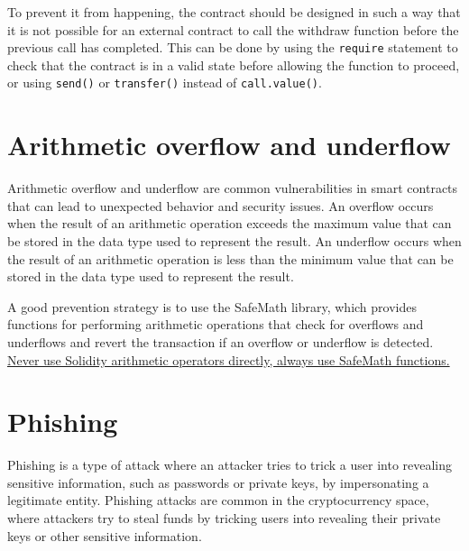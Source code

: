 To prevent it from happening, the contract should be designed in such a way that it is not possible for an external contract to call the withdraw function before the previous call has completed. This can be done by using the \texttt{require} statement to check that the contract is in a valid state before allowing the function to proceed, or using \texttt{send()} or \texttt{transfer()} instead of \texttt{call.value()}.

\section{Arithmetic overflow and underflow}
Arithmetic overflow and underflow are common vulnerabilities in smart contracts that can lead to unexpected behavior and security issues. An overflow occurs when the result of an arithmetic operation exceeds the maximum value that can be stored in the data type used to represent the result. An underflow occurs when the result of an arithmetic operation is less than the minimum value that can be stored in the data type used to represent the result.

A good prevention strategy is to use the SafeMath library, which provides functions for performing arithmetic operations that check for overflows and underflows and revert the transaction if an overflow or underflow is detected.
\ul{Never use Solidity arithmetic operators directly, always use SafeMath functions.}

\section{Phishing}
Phishing is a type of attack where an attacker tries to trick a user into revealing sensitive information, such as passwords or private keys, by impersonating a legitimate entity. Phishing attacks are common in the cryptocurrency space, where attackers try to steal funds by tricking users into revealing their private keys or other sensitive information.